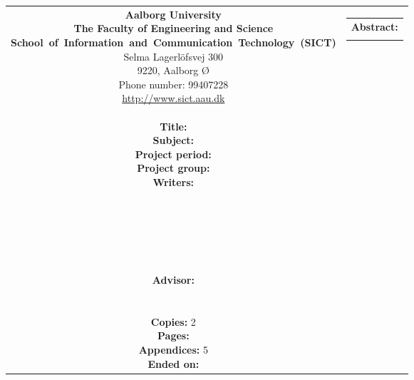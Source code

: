 \thispagestyle{empty}
{\samepage 
\begin{tabular}{cc}
	\parbox{7cm}{
	{\sf\noindent
	\textbf{Aalborg University}\\
	\textbf{The Faculty of Engineering and Science}\\
	\mbox{\textbf{School of Information and Communication Technology (SICT)}}\\
	Selma Lagerlöfsvej 300\\
	9220, Aalborg Ø\\
	Phone number: 99407228\\
	\url{http://www.sict.aau.dk}} \\\\
	{\bf Title:} \TITLE\\
	{\bf Subject:} \SUBJECT\\
	{\bf Project period:} \PERIOD\\
	{\bf Project group:} \GROUPNUMBER\\
	{\bf Writers:}\\[0.7cm]
      		\underline{\phantom{\TPNAMESPACE}}\\
      		\NAMEONE \\[0.7cm]
      		\underline{\phantom{\TPNAMESPACE}}\\
      		\NAMETWO \\[0.7cm]
      		\underline{\phantom{\TPNAMESPACE}}\\
      		\NAMETHREE \\[0.7cm]
	{\bf Advisor:} \\
	\SUPERVISOR \\\\
	{\bf Copies:} 2\\
	{\bf Pages:} \pageref{LastPage}\\
	{\bf Appendices:} 5\\
	{\bf Ended on:} \ENDDATE
	\vfill} &
	\parbox{7cm}{
	\vspace{.15cm}
	\hfill 
	\begin{tabular}{l}
		{\bf Abstract:}\bigskip \\
		\fbox{
		\parbox{6cm}{\bigskip
		{\vfill{\small 
		\bigskip}}
		}\hspace{0.2em}}
	\end{tabular}}
\end{tabular}\vfill
{}
}